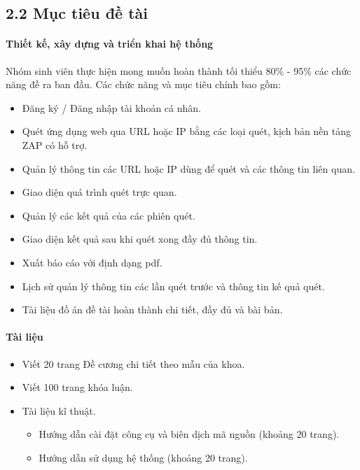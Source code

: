 \subsection*{2.2  Mục tiêu đề tài}
\paragraph{Thiết kế, xây dựng và triển khai hệ thống}
\tab Nhóm sinh viên thực hiện mong muốn hoàn thành tối thiểu 80\% - 95\% các chức năng đề ra ban đầu. Các chức năng và mục tiêu chính bao gồm:
\begin{itemize}
    \item Đăng ký / Đăng nhập tài khoản cá nhân.
    \item Quét ứng dụng web qua URL hoặc IP bằng các loại quét, kịch bản nền tảng ZAP có hỗ trợ.
    \item Quản lý thông tin các URL hoặc IP dùng để quét và các thông tin liên quan.
    \item Giao diện quá trình quét trực quan.
    \item Quản lý các kết quả của các phiên quét.
    \item Giao diện kết quả sau khi quét xong đầy đủ thông tin.
    \item Xuất báo cáo với định dạng pdf.
    \item Lịch sử quản lý thông tin các lần quét trước và thông tin kế quả quét.
    \item Tài liệu đồ án đề tài hoàn thành chi tiết, đầy đủ và bài bản.
\end{itemize}
\paragraph{Tài liệu}
\begin{itemize}
    \item Viết 20 trang Đề cương chi tiết theo mẫu của khoa.
    \item Viết 100 trang khóa luận.
    \item Tài liệu kĩ thuật.
    \begin{itemize}
        \item Hướng dẫn cài đặt công cụ và biên dịch mã nguồn (khoảng 20 trang).
        \item Hướng dẫn sử dụng hệ thống (khoảng 20 trang).
    \end{itemize}
\end{itemize}